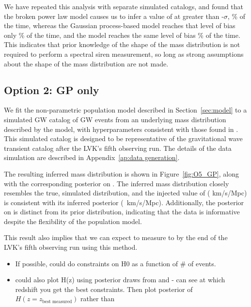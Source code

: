 \documentclass[]{aastex631}
\begin{document}
We have repeated this analysis with  separate simulated catalogs, and found that the broken power law model causes us to infer a  value of \Ho{} at greater than -$\sigma$, \% of the time, whereas the Gaussian process-based model reaches that level of bias only \% of the time, and the \plp{} model reaches the same level of bias \% of the time.
This indicates that prior knowledge of the shape of the mass distribution is not required to perform a spectral siren measurement, so long as strong assumptions about the shape of the mass distribution are not made.

 

\subsection{Option 2: GP only}
We fit the non-parametric population model described in Section~\ref{sec:model} to a simulated GW catalog of GW events from an underlying mass distribution described by the \plp{} model, with hyperparameters consistent with those found in \citet{o3b_pop}.
This simulated catalog is designed to be representative of the gravitational wave transient catalog after the LVK's fifth observing run.
The details of the data simulation are described in Appendix~\ref{ap:data generation}.

The resulting inferred mass distribution is shown in Figure~\ref{fig:O5_GP}, along with the corresponding posterior on \Ho.
The inferred mass distribution closely resembles the true, simulated distribution, and the injected value of \Ho ( km/s/Mpc) is consistent with its inferred posterior ( \,km/s/Mpc).
Additionally, the posterior on \Ho{} is distinct from its prior distribution, indicating that the data is informative despite the flexibility of the population model.

This result also implies that we can expect to measure \Ho{} to  by the end of the LVK's fifth observing run using this method.

\begin{itemize}
    \item If possible, could do constraints on H0 as a function of \# of events.
    \item could also plot H(z) using posterior draws from \Ho{} and \Omm{}- can see at which redshift you get the best constraints. Then plot posterior of $H(z=z_{\text{best measured}})$ rather than \Ho {}
\end{itemize}
\end{document}
